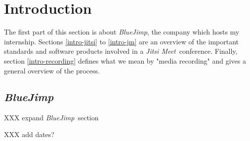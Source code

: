 \documentclass[twoside,openright,a4paper,11pt,english]{article}
\begin{document}

\def\j{\emph{Jitsi}}
\def\jvb{\emph{Jitsi-Videobridge}}
\def\bj{\emph{BlueJimp}}
\def\lj{\emph{libjitsi}}
\def\wrtc{\emph{webrtc.org}}
\def\jm{\emph{Jitsi Meet}}





\newpage
\pagestyle{empty}
\newpage


\parskip=0pt
\tableofcontents

\newpage
\pagestyle{empty}
\newpage

\thispagestyle{plain}
\pagestyle{plain}


\begin{abstract}
This document is submitted as part of the requirements for obtaining a masters
degree in informatics at the University of Strasbourg. It describes work done
during a 6-months long internship. A modern video
conferencing application based on WebRTC (\jm)is discussed, and a system for
media recording, which I helped to design and implement, is examined in detail.
The first section serves as an introduction to the work environment for the
internship and the most important technologies discussed later on. The rest 
of the sections examine specific parts of the media recording process.
\end{abstract}




\section{Introduction}
\label{chap:intro}
The first part of this section is about \bj, the company which hosts my internship.
Sections \ref{intro-jitsi} to \ref{intro-jm} are an overview of the
important standards and software products involved in a \jm\ conference.
Finally, section \ref{intro-recording}
defines what we mean by "media recording" and gives a general overview of the
process.




\subsection{\bj}
XXX expand \bj\ section

XXX add dates?
\end{document}
